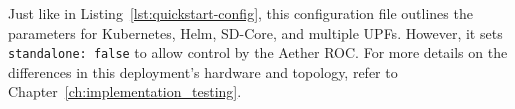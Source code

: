 \noindent
Just like in Listing~\ref{lst:quickstart-config}, this configuration file outlines the 
parameters for Kubernetes, Helm, SD-Core, and multiple UPFs. However, it sets 
\texttt{standalone: false} to allow control by the Aether ROC. For more details on the 
differences in this deployment's hardware and topology, refer to 
Chapter~\ref{ch:implementation_testing}.
